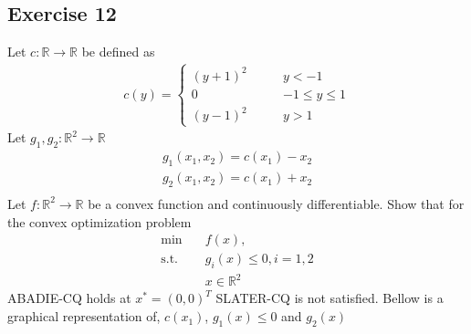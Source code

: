 \subsection{Exercise 12}
Let $c: \mathbb{R}\to \mathbb{R}$ be defined as
\begin{align}
    c(y) =
    \begin{cases}
        (y+1)^{2} \qquad &y < -1\\
        0 \qquad &-1 \le y \le 1\\
        (y-1)^{2} \qquad &y > 1
    \end{cases}
\end{align}
Let $g_1, g_2: \mathbb{R}^{2}\to \mathbb{R}$
\begin{align}
    g_1(x_1, x_2) = c(x_1) - x_2\\
    g_2(x_1, x_2) = c(x_1) + x_2\\
\end{align}
Let $f: \mathbb{R}^{2} \to \mathbb{R}$ be a convex function and continuously
differentiable. Show that for the convex optimization problem
\begin{align}
    \text{min}\quad & f(x),\\
    \text{s.t.}\quad & g_i(x) \le 0, i=1,2\nonumber\\
    & x \in \mathbb{R}^{2}\nonumber
\end{align}
ABADIE-CQ holds at $x^{*}= (0, 0)^{T}$ SLATER-CQ is not satisfied.
\newline
Bellow is a graphical representation of, $c(x_1)$, $g_1(x) \le 0$ and
$g_2(x)$
